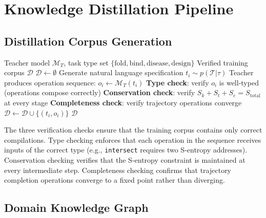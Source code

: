 \documentclass[11pt,twocolumn,a4paper]{article}
\theoremstyle{definition}
\theoremstyle{remark}
\newcommand{\Sk}{S_k}
\newcommand{\St}{S_t}
\newcommand{\Se}{S_e}
\newcommand{\dataset}{\mathcal{D}}
\newcommand{\model}{\mathcal{M}}
\newcommand{\taskspace}{\mathcal{T}}
\begin{document}
\section{Knowledge Distillation Pipeline}
\label{sec:distillation}

\subsection{Distillation Corpus Generation}

\begin{algorithm}[H]
\caption{Distillation Corpus Generation}
\label{alg:distillation}
\begin{algorithmic}[1]
\REQUIRE Teacher model $\model_T$, task type set $\{\text{fold}, \text{bind}, \text{disease}, \text{design}\}$
\ENSURE Verified training corpus $\dataset$
\STATE $\dataset \leftarrow \emptyset$
        \STATE Generate natural language specification $t_i \sim p(\taskspace | \tau)$
        \STATE Teacher produces operation sequence: $o_i \leftarrow \model_T(t_i)$
        \STATE \textbf{Type check}: verify $o_i$ is well-typed (operations compose correctly)
        \STATE \textbf{Conservation check}: verify $\Sk + \St + \Se = S_{\mathrm{total}}$ at every stage
        \STATE \textbf{Completeness check}: verify trajectory operations converge
            \STATE $\dataset \leftarrow \dataset \cup \{(t_i, o_i)\}$
        \ENDIF
    \ENDFOR
\ENDFOR
\RETURN $\dataset$
\end{algorithmic}
\end{algorithm}

The three verification checks ensure that the training corpus contains only correct compilations. Type checking enforces that each operation in the sequence receives inputs of the correct type (e.g., \texttt{intersect} requires two S-entropy addresses). Conservation checking verifies that the S-entropy constraint is maintained at every intermediate step. Completeness checking confirms that trajectory completion operations converge to a fixed point rather than diverging.

\subsection{Domain Knowledge Graph}
\end{document}
